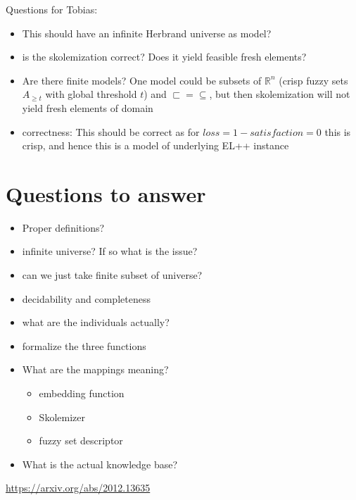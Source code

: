 \documentclass[]{article}
\begin{document}
Questions for Tobias:
\begin{itemize}
	\item This should have an infinite Herbrand universe as model?
	\item is the skolemization correct? Does it yield feasible fresh elements?
	\item Are there finite models? One model could be subsets of $\mathbb{R}^n$ (crisp fuzzy sets $A_{\geq t}$ with global threshold $t$) and $\sqsubset = \subseteq$, but then skolemization will not yield fresh elements of domain
	\item correctness: This should be correct as for $ loss = 1-satisfaction = 0$ this is crisp, and hence this is a model of underlying EL++ instance
\end{itemize}



\section{Questions to answer}

\begin{itemize}
	\item Proper definitions?
	\item infinite universe? If so what is the issue?
	\item can we just take finite subset of universe?
  \item decidability and completeness
\end{itemize}




\begin{itemize}
	\item what are the individuals actually?
	\item formalize the three functions
	\item What are the mappings meaning?
	\begin{itemize}
		\item embedding function
		\item Skolemizer
		\item fuzzy set descriptor
	\end{itemize}
	\item What is the actual knowledge base? 
	
\end{itemize}


\begin{thebibliography}{100}
	 \url{https://arxiv.org/abs/2012.13635}
\end{thebibliography}
\end{document}
